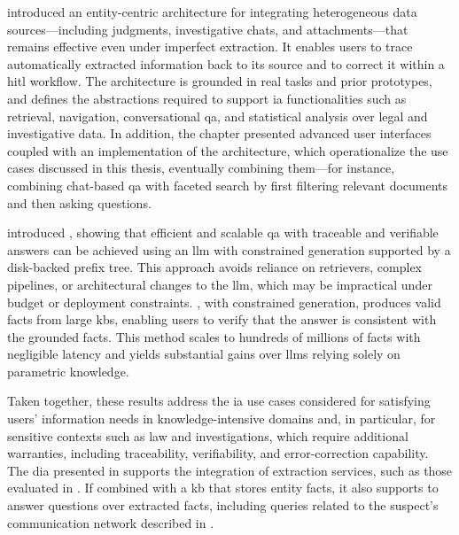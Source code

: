  introduced an entity-centric architecture for integrating heterogeneous data sources---including judgments, investigative chats, and attachments---that remains effective even under imperfect extraction. It enables users to trace automatically extracted information back to its source and to correct it within a \acl{hitl} workflow. The architecture is grounded in real tasks and prior prototypes, and defines the abstractions required to support \acl{ia} functionalities such as retrieval, navigation, conversational \acl{qa}, and statistical analysis over legal and investigative data. In addition, the chapter presented advanced user interfaces coupled with an implementation of the architecture, which operationalize the use cases discussed in this thesis, eventually combining them---for instance, combining chat-based \acl{qa} with faceted search by first filtering relevant documents and then asking questions.


 introduced , showing that efficient and scalable \acl{qa} with traceable and verifiable answers can be achieved using an \ac{llm} with constrained generation supported by a disk-backed prefix tree.
This approach avoids reliance on retrievers, complex pipelines, or architectural changes to the \ac{llm}, which may be impractical under budget or deployment constraints.
, with constrained generation, produces valid facts from large \acp{kb}, enabling users to verify that the answer is consistent with the grounded facts.
This method scales to hundreds of millions of facts with negligible latency and yields substantial gains over \acp{llm} relying solely on parametric knowledge.

Taken together, these results address the \acl{ia} use cases considered for satisfying users' information needs in knowledge-intensive domains and, in particular, for sensitive contexts such as law and investigations, which require additional warranties, including traceability, verifiability, and error-correction capability.
The \acl{dia} presented in  supports the integration of extraction services, such as those evaluated in . If combined with a \acl{kb} that stores entity facts, it also supports  to answer questions over extracted facts, including queries related to the suspect's communication network described in .


